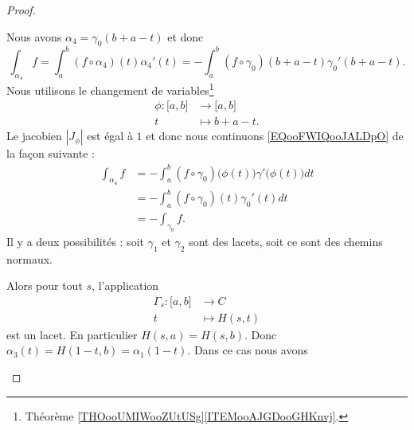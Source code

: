 \begin{proof}
\begin{subproof}
		Nous avons \( \alpha_4=\gamma_0(b+a-t)\) et donc
		\begin{equation}        \label{EQooFWIQooJALDpO}
			\int_{\alpha_4}f=\int_a^b(f\circ \alpha_4)(t)\alpha_4'(t)= -\int_a^b(f\circ \gamma_0)(b+a-t)\gamma_0'(b+a-t).
		\end{equation}
		Nous utilisons le changement de variables\footnote{Théorème \ref{THOooUMIWooZUtUSg}\ref{ITEMooAJGDooGHKnvj}.}
		\begin{equation}
			\begin{aligned}
				\phi\colon \mathopen[ a , b \mathclose] & \to \mathopen[ a , b \mathclose] \\
				t                                       & \mapsto b+a-t .
			\end{aligned}
		\end{equation}
		Le jacobien \( | J_{\phi} |\) est égal à \( 1\) et donc nous continuons \eqref{EQooFWIQooJALDpO} de la façon suivante :
		\begin{subequations}
			\begin{align}
				\int_{\alpha_4}f & =-\int_a^b(f\circ\gamma_0)\big( \phi(t) \big)\gamma'\big( \phi(t) \big)dt \\
				                 & =-\int_a^b(f\circ\gamma_0)(t)\gamma_0'(t)dt                               \\
				                 & =-\int_{\gamma_0}f.
			\end{align}
		\end{subequations}
		Il y a deux possibilités : soit \( \gamma_1\) et \( \gamma_2\) sont des lacets, soit ce sont des chemins normaux.
		\begin{subproof}
			Alors pour tout \( s\), l'application
			\begin{equation}
				\begin{aligned}
					\Gamma_s\colon \mathopen[ a , b \mathclose] & \to C          \\
					t                                           & \mapsto H(s,t)
				\end{aligned}
			\end{equation}
			est un lacet. En particulier \( H(s,a)=H(s,b)\). Donc \( \alpha_3(t)=H(1-t,b)=\alpha_1(1-t)\). Dans ce cas nous avons
			\begin{subequations}

\end{subequations}
\end{subproof}
\end{subproof}
\end{proof}
